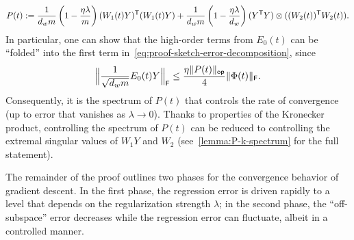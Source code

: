 \[
	P(t) :=
	\frac{1}{\dhid \din}
	\left(1 - \frac{\eta \lambda}{\din}\right) (W_1(t) Y)^{\T} (W_{1}(t) Y) \\
	+ \frac{1}{\dhid \din}
	\left(1 - \frac{\eta \lambda}{\dhid}\right) (Y^{\T} Y) \otimes ((W_{2}(t))^{\T} W_{2}(t)).
\]
In particular, one can show that the high-order terms from $E_0(t)$
can be ``folded'' into the first term in~\eqref{eq:proof-sketch-error-decomposition}, since
\begin{equation}
	\frobnorm[\Big]{\frac{1}{\sqrt{\dhid \din}} E_0(t) Y} \leq
	\frac{\eta \opnorm{P(t)}}{4} \frobnorm{\Phi(t)}.
\end{equation}
Consequently, it is the spectrum of $P(t)$ that controls the rate of convergence (up to error that vanishes as $\lambda \rightarrow 0$). Thanks to properties of the Kronecker product, controlling the
spectrum of $P(t)$ can be reduced to controlling the extremal singular values of $W_{1} Y$ and $W_2$ (see~\cref{lemma:P-k-spectrum} for the full statement).

The remainder of the proof outlines two phases for the convergence behavior of gradient descent. In the first phase,
the regression error is driven rapidly to a level that depends
on the regularization strength $\lambda$; in the second phase, the ``off-subspace'' error decreases while the regression error can fluctuate, albeit in a controlled manner.
\vspace*{-1em}
